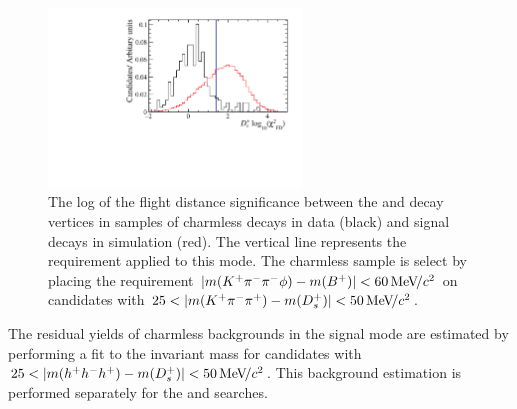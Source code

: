 \begin{figure}[!h]
    \centering
        \includegraphics[width=0.6\textwidth]{figs/Selection/Charmless_Comparison_B2DsPhi_Ds2KPiPi_log10_D_FDCHI2_ORIVX.pdf}
        \caption{The log of the flight distance significance between the \Bp and \Dsp decay vertices in samples of charmless \decay{\Bp}{\Kp\pim\pip\phiz} decays in data (black) and \decay{\Bp}{(\decay{\Dsp}{\Kp\pim\pip})\phiz} signal decays in simulation (red). The vertical line represents the requirement applied to this mode. The charmless \decay{\Bp}{\Kp\pim\pip\phiz} sample is select by placing the requirement $|m({{K}^+}{{\pi}^-}{{\pi}^-}\phi)-m({{{B}^+}})|<60{\mathrm{\,Me\kern -0.1em V\!/}c^2}$ on \decay{\Bp}{(\decay{\Dsp}{\Kp\pim\pip})\phiz} candidates with $25 < |m({{K}^+}{{\pi}^-}{{\pi}^+}) - m({{D}^+_{s}})| < 50{\mathrm{\,Me\kern -0.1em V\!/}c^2} $.}
    \label{fig:Selection_FDCHI2}   
\end{figure}

The residual yields of charmless backgrounds in the signal mode are estimated by performing a fit to the \Bp invariant mass for candidates with $25 < |m(h^{+}h^{-}h^{+}) - m({{D}^+_{s}})| < 50{\mathrm{\,Me\kern -0.1em V\!/}c^2} $. This background estimation is performed separately for the \decay{\Bp}{\Dsp\phiz} and \decay{\Bp}{\Dsp\Kp\Km} searches. 

